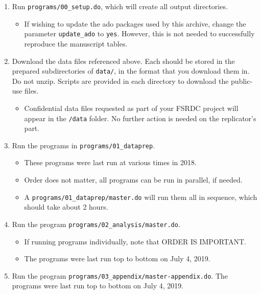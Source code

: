 \documentclass[
]{article}
\providecommand{\tightlist}{%
  \setlength{\itemsep}{0pt}\setlength{\parskip}{0pt}}
\begin{document}
\begin{enumerate}
\def\labelenumi{\arabic{enumi}.}
\tightlist
\item
  Run \texttt{programs/00\_setup.do}, which will create all output
  directories.

  \begin{itemize}
  \tightlist
  \item
    If wishing to update the ado packages used by this archive, change
    the parameter \texttt{update\_ado} to \texttt{yes}. However, this is
    not needed to successfully reproduce the manuscript tables.
  \end{itemize}
\item
  Download the data files referenced above. Each should be stored in the
  prepared subdirectories of \texttt{data/}, in the format that you
  download them in. Do not unzip. Scripts are provided in each directory
  to download the public-use files.

  \begin{itemize}
  \tightlist
  \item
    Confidential data files requested as part of your FSRDC project will
    appear in the \texttt{/data} folder. No further action is needed on
    the replicator's part.
  \end{itemize}
\item
  Run the programs in \texttt{programs/01\_dataprep}.

  \begin{itemize}
  \tightlist
  \item
    These programs were last run at various times in 2018.
  \item
    Order does not matter, all programs can be run in parallel, if
    needed.
  \item
    A \texttt{programs/01\_dataprep/master.do} will run them all in
    sequence, which should take about 2 hours.
  \end{itemize}
\item
  Run the program \texttt{programs/02\_analysis/master.do}.

  \begin{itemize}
  \tightlist
  \item
    If running programs individually, note that ORDER IS IMPORTANT.
  \item
    The programs were last run top to bottom on July 4, 2019.
  \end{itemize}
\item
  Run the program \texttt{programs/03\_appendix/master-appendix.do}. The
  programs were last run top to bottom on July 4, 2019.
\end{enumerate}
\end{document}
